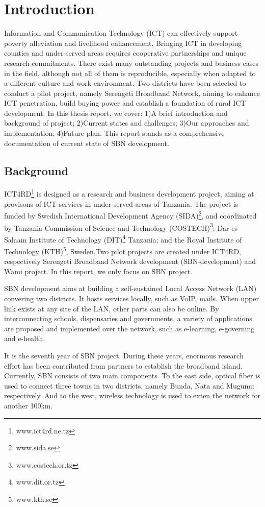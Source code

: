 \chapter{Introduction}
Information and Communication Technology (ICT) can effectively support poverty alleviation and livelihood enhancement. Bringing ICT in developing counties and under-served areas requires cooperative partnerships and unique research commitments. There exist many outstanding projects and business cases in the field, although not all of them is reproducible, especially when adapted to a different culture and work environment.
Two districts have been selected to conduct a pilot project, namely Serengeti Broadband Network, aiming to enhance ICT penetration, build buying power and establish a foundation of rural ICT development. In this thesis report, we cover: 1)A brief introduction and background of project; 2)Current states and challenges; 3)Our approaches and implementation; 4)Future plan. This report stands as a comprehensive documentation of current state of SBN development.


\section{Background}
ICT4RD\footnote{www.ict4rd.ne.tz} is designed as a research and business development project, aiming at provisons of ICT services in under-served areas of Tanzania. The project is funded by Swedish International Development Agency (SIDA)\footnote{www.sida.se}, and coordinated by Tanzania Commission of Science and Technology (COSTECH)\footnote{www.costech.or.tz}; Dar es Salaam Institute of Technology (DIT)\footnote{www.dit.or.tz} Tanzania; and the Royal Institute of Technology (KTH)\footnote{www.kth.se}, Sweden.Two pilot projects are created under ICT4RD, respectively Serengeti Broadband Network development (SBN-development) and Wami project. In this report, we only focus on SBN project.

SBN development aims at building a self-sustained Local Access Network (LAN) convering two districts\cite{nungu_thesis}. It hosts services locally, such as VoIP, mails. When upper link exists at any site of the LAN, other parts can also be online. By interconnecting schools, dispensaries and governments, a variety of applications are proposed and implemented over the network, such as e-learning, e-governing and e-health.

It is the seventh year of SBN project. During these years, enormous research effort has been contributed from partners to establish the broadband island. Currently, SBN consists of two main components. To the east side, optical fiber is used to connect three towns in two districts, namely Bunda, Nata and Mugumu respectively. And to the west, wireless technology is used to exten the network for another 100km.

